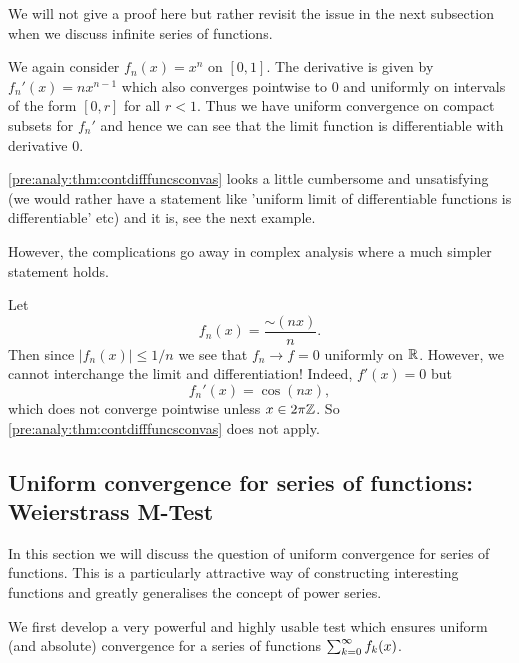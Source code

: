 \documentclass[10pt, a4paper]{article}
\begin{document}
We will not give a proof here but rather revisit the issue in the next subsection when we discuss infinite series of functions.

\begin{example}
    We again consider $f_n(x) = x ^ n$ on $[0, 1]$.
    The derivative is given by $f_n'(x) = nx ^ {n - 1}$ which also converges pointwise to $0$ and uniformly on intervals of the form $[0, r]$ for all $r < 1$.
    Thus we have uniform convergence on compact subsets for $f_n'$ and hence we can see that the limit function is differentiable with derivative $0$.
\end{example}

\begin{remark}
    \autoref{pre:analy:thm:contdifffuncsconvas} looks a little cumbersome and unsatisfying
    (we would rather have a statement like 'uniform limit of differentiable functions is differentiable' etc)
    and it is,
    see the next example.

    However,
    the complications go away in complex analysis where a much simpler statement holds.
\end{remark}

\begin{example}
    Let
    \[
    f_n(x) = \frac{\sim(nx)}{n}.
    \]
    Then since $|f_n(x)| \leq 1 / n$ we see that $f_n \rightarrow f = 0$ uniformly on $\mathbb{R}$.
    However,
    we cannot interchange the limit and differentiation!
    Indeed,
    $f'(x) = 0$ but
    \[
    f_n'(x) = \cos(nx),
    \]
    which does not converge pointwise unless $x \in 2\pi\mathbb{Z}$.
    So \autoref{pre:analy:thm:contdifffuncsconvas} does not apply.
\end{example}

\subsection{Uniform convergence for series of functions: Weierstrass M-Test}

In this section we will discuss the question of uniform convergence for series of functions.
This is a particularly attractive way of constructing interesting functions and greatly generalises the concept of power series.

We first develop a very powerful and highly usable test which ensures uniform
(and absolute)
convergence for a series of functions $\sum_{k = 0}^{\infty} f_k(x)$.
\end{document}

